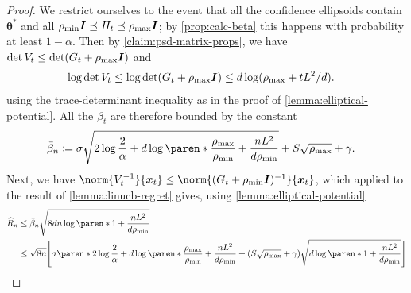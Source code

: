 \documentclass{article}
\renewcommand{\vec}[1]{\bm{#1}}
\newcommand{\defeq}{\coloneq}
\newcommand{\inv}[1]{#1^{-1}}
\newcommand{\tr}{\operatorname{tr}}
\renewcommand{\det}{\operatorname{det}}
\DeclarePairedDelimiter{\abs}||
\DeclarePairedDelimiter{\paren}()
\DeclarePairedDelimiter{\brck}{[}{]}
\newcommand{\Dset}[1]{\mathcal{D}_{#1}}
\newcommand{\Eye}[1][]{\bm{I}\notblank{#1}{_{{#1}\times{#1}}}{}}
\begin{document}
\ThmLinUCBRegret*


\begin{proof}
  We restrict ourselves to the event that all the confidence
  ellipsoids contain $\vec\theta^*$ and all
  $\rho_{\min}\Eye \preceq H_t \preceq \rho_{\max}\Eye$; by
  \cref{prop:calc-beta} this happens with probability at least
  $1-\alpha$.  Then by \cref{claim:psd-matrix-props}, we have
  $\det V_t \le \det(G_t+\rho_{\max}\Eye)$ and
  \begin{align*}
    \log\det V_t
    &\le \log\det(G_t + \rho_{\max}\Eye)
    \le d\log(\rho_{\max} + tL^2/d).
  \end{align*}
  using the trace-determinant inequality as in the proof of
  \cref{lemma:elliptical-potential}.  All the $\beta_t$ are therefore
  bounded by the constant
  \begin{align*}
    \bar\beta_n &\defeq \sigma\sqrt{2\log\frac{2}{\alpha} + d\log\paren*{\frac{\rho_{\max}}{\rho_{\min}}
                 + \frac{nL^2}{d\rho_{\min}}}}
                 + S\sqrt{\rho_{\max}} + \gamma.
  \end{align*}
  Next, we have
  $\norm{\inv{V_t}}{\vec x_t} \le
  \norm{\inv{(G_t+\rho_{\min}\Eye)}}{\vec x_t}$, which applied to the
  result of \cref{lemma:linucb-regret} gives, using
  \cref{lemma:elliptical-potential}
  \begin{align*}
    \widehat{R}_n
    &\le \bar\beta_n\sqrt{8dn\log\paren*{1+\frac{nL^2}{d\rho_{\min}}}} \\
    &\le \sqrt{8n}\brck*{\sigma\paren*{2\log\frac{2}{\alpha}
      + d\log\paren*{\frac{\rho_{\max}}{\rho_{\min}} + \frac{nL^2}{d\rho_{\min}}}}
      + (S\sqrt{\rho_{\max}}+\gamma)\sqrt{d\log\paren*{1+\frac{nL^2}{d\rho_{\min}}}}} \qedhere
  \end{align*}
\end{proof}
\end{document}
